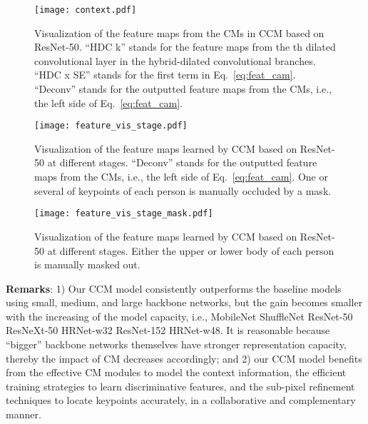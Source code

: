 \documentclass[twocolumn]{svjour3}          \smartqed  \usepackage{natbib}
\begin{document}
\begin{figure*}[t]
\begin{center}
   \texttt{[image: context.pdf]}
\end{center}
   \caption{Visualization of the feature maps from the CMs in CCM based on ResNet-50. ``HDC k'' stands for the feature maps from the {th} dilated convolutional layer in the hybrid-dilated convolutional branches. ``HDC x SE'' stands for the first term in Eq.~\eqref{eq:feat_cam}. ``Deconv'' stands for the outputted feature maps from the CMs, i.e., the left side of Eq.~\eqref{eq:feat_cam}.}
\label{fig:context}
\end{figure*}

\begin{figure}[!ht]
\begin{center}
   \texttt{[image: feature\_vis\_stage.pdf]}
\end{center}
   \caption{Visualization of the feature maps learned by CCM based on ResNet-50 at different stages. ``Deconv'' stands for the outputted feature maps from the CMs, i.e., the left side of Eq.~\eqref{eq:feat_cam}. One or several of keypoints of each person is manually occluded by a mask.}
\label{fig:feature_vis}
\end{figure}

\begin{figure}[!ht]
\begin{center}
   \texttt{[image: feature\_vis\_stage\_mask.pdf]}
\end{center}
   \caption{Visualization of the feature maps learned by CCM based on ResNet-50 at different stages. Either the upper or lower body of each person is manually masked out.}
\label{fig:feature_vis_mask}
\end{figure}

\textbf{Remarks}: 1) Our CCM model consistently outperforms the baseline models using small, medium, and large backbone networks, but the gain becomes smaller with the increasing of the model capacity, i.e., MobileNet  ShuffleNet  ResNet-50  ResNeXt-50  HRNet-w32  ResNet-152  HRNet-w48. It is reasonable because ``bigger'' backbone networks themselves have stronger representation capacity, thereby the impact of CM decreases accordingly; and 2) our CCM model benefits from the effective CM modules to model the context information, the efficient training strategies to learn discriminative features, and the sub-pixel refinement techniques to locate keypoints accurately, in a collaborative and complementary manner.  
\end{document}
